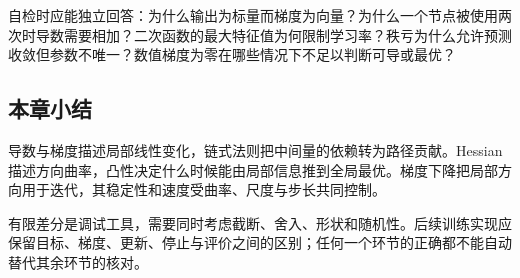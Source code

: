 \documentclass[UTF8,fontset=none,zihao=-4,a4paper]{ctexart}
\numberwithin{equation}{section}
\numberwithin{figure}{section}
\begin{document}
自检时应能独立回答：为什么输出为标量而梯度为向量？为什么一个节点被使用两次时导数需要相加？二次函数的最大特征值为何限制学习率？秩亏为什么允许预测收敛但参数不唯一？数值梯度为零在哪些情况下不足以判断可导或最优？

\subsection{本章小结}
导数与梯度描述局部线性变化，链式法则把中间量的依赖转为路径贡献。Hessian描述方向曲率，凸性决定什么时候能由局部信息推到全局最优。梯度下降把局部方向用于迭代，其稳定性和速度受曲率、尺度与步长共同控制。

有限差分是调试工具，需要同时考虑截断、舍入、形状和随机性。后续训练实现应保留目标、梯度、更新、停止与评价之间的区别；任何一个环节的正确都不能自动替代其余环节的核对。

\clearpage
\end{document}
